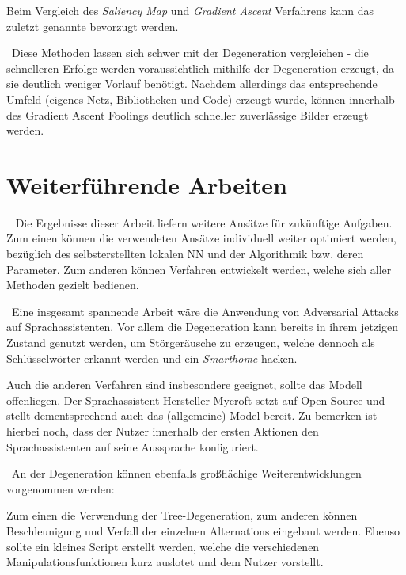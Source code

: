 Beim Vergleich des \textit{Saliency Map} und \textit{Gradient Ascent} Verfahrens kann das zuletzt genannte bevorzugt werden. 

~\newline Diese Methoden lassen sich schwer mit der Degeneration vergleichen - die schnelleren Erfolge werden voraussichtlich mithilfe der Degeneration erzeugt, da sie deutlich weniger Vorlauf benötigt.
Nachdem allerdings das entsprechende Umfeld (eigenes Netz, Bibliotheken und Code) erzeugt wurde, können innerhalb des Gradient Ascent Foolings deutlich schneller zuverlässige Bilder erzeugt werden.  



\section{Weiterführende Arbeiten}~\newline 
Die Ergebnisse dieser Arbeit liefern weitere Ansätze für zukünftige Aufgaben. Zum einen können die verwendeten Ansätze individuell weiter optimiert werden, bezüglich des selbsterstellten lokalen \acl{NN} und der Algorithmik bzw. deren Parameter. Zum anderen können Verfahren entwickelt werden, welche sich aller Methoden gezielt bedienen. 


~\newline Eine insgesamt spannende Arbeit wäre die Anwendung von Adversarial Attacks auf Sprachassistenten. 
Vor allem die Degeneration kann bereits in ihrem jetzigen Zustand genutzt werden, um Störgeräusche zu erzeugen, welche dennoch als Schlüsselwörter erkannt werden und ein \textit{Smarthome} hacken. 

Auch die anderen Verfahren sind insbesondere geeignet, sollte das Modell offenliegen. Der Sprachassistent-Hersteller Mycroft setzt auf Open-Source und stellt dementsprechend auch das (allgemeine) Model bereit. 
Zu bemerken ist hierbei noch, dass der Nutzer innerhalb der ersten Aktionen den Sprachassistenten auf seine Aussprache konfiguriert.  

~\newline An der Degeneration können ebenfalls großflächige Weiterentwicklungen vorgenommen werden: 

Zum einen die Verwendung der Tree-Degeneration, zum anderen können Beschleunigung und Verfall der einzelnen Alternations eingebaut werden. Ebenso sollte ein kleines Script erstellt werden, welche die verschiedenen Manipulationsfunktionen kurz auslotet und dem Nutzer vorstellt. 

